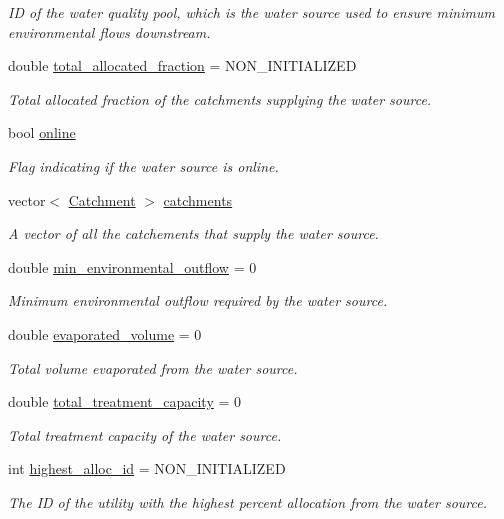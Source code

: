 \begin{DoxyCompactItemize}
\begin{DoxyCompactList}\small\item\em ID of the water quality pool, which is the water source used to ensure minimum environmental flows downstream. \end{DoxyCompactList}\item 
double \mbox{\hyperlink{classWaterSource_a4be6864dc196287bdf8329b3aa6ca662}{total\+\_\+allocated\+\_\+fraction}} = N\+O\+N\+\_\+\+I\+N\+I\+T\+I\+A\+L\+I\+Z\+ED
\begin{DoxyCompactList}\small\item\em Total allocated fraction of the catchments supplying the water source. \end{DoxyCompactList}\item 
bool \mbox{\hyperlink{classWaterSource_aef4e289b47c2360f2e991ea3ee535781}{online}}
\begin{DoxyCompactList}\small\item\em Flag indicating if the water source is online. \end{DoxyCompactList}\item 
vector$<$ \mbox{\hyperlink{classCatchment}{Catchment}} $>$ \mbox{\hyperlink{classWaterSource_a8c18c34f23f8a06685c1d12f462ed830}{catchments}}
\begin{DoxyCompactList}\small\item\em A vector of all the catchements that supply the water source. \end{DoxyCompactList}\item 
double \mbox{\hyperlink{classWaterSource_adae67ac96597e4b25332002b88a9a52b}{min\+\_\+environmental\+\_\+outflow}} = 0
\begin{DoxyCompactList}\small\item\em Minimum environmental outflow required by the water source. \end{DoxyCompactList}\item 
double \mbox{\hyperlink{classWaterSource_a6085899c4b4cc40fa80784203e1a9755}{evaporated\+\_\+volume}} = 0
\begin{DoxyCompactList}\small\item\em Total volume evaporated from the water source. \end{DoxyCompactList}\item 
double \mbox{\hyperlink{classWaterSource_a2fdfd5ff7d103e71108cf2a31babaccb}{total\+\_\+treatment\+\_\+capacity}} = 0
\begin{DoxyCompactList}\small\item\em Total treatment capacity of the water source. \end{DoxyCompactList}\item 
int \mbox{\hyperlink{classWaterSource_a83c6dcf19b64533ce4bc3b918ce6cc8e}{highest\+\_\+alloc\+\_\+id}} = N\+O\+N\+\_\+\+I\+N\+I\+T\+I\+A\+L\+I\+Z\+ED
\begin{DoxyCompactList}\small\item\em The ID of the utility with the highest percent allocation from the water source. \end{DoxyCompactList}\end{DoxyCompactItemize}

